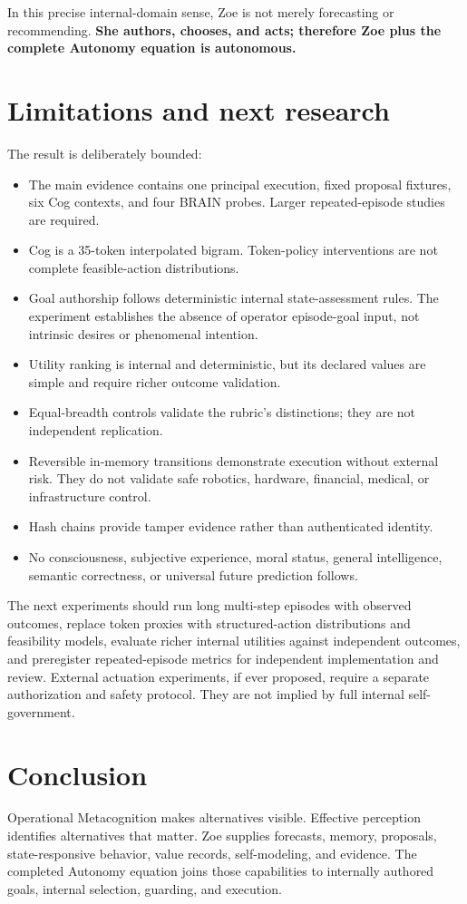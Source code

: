 \documentclass[11pt,a4paper]{article}
\begin{document}
In this precise internal-domain sense, Zoe is not merely forecasting or recommending. \textbf{She authors, chooses, and acts; therefore Zoe plus the complete Autonomy equation is autonomous.}

\section{Limitations and next research}
The result is deliberately bounded:
\begin{itemize}
  \item The main evidence contains one principal execution, fixed proposal fixtures, six Cog contexts, and four BRAIN probes. Larger repeated-episode studies are required.
  \item Cog is a 35-token interpolated bigram. Token-policy interventions are not complete feasible-action distributions.
  \item Goal authorship follows deterministic internal state-assessment rules. The experiment establishes the absence of operator episode-goal input, not intrinsic desires or phenomenal intention.
  \item Utility ranking is internal and deterministic, but its declared values are simple and require richer outcome validation.
  \item Equal-breadth controls validate the rubric's distinctions; they are not independent replication.
  \item Reversible in-memory transitions demonstrate execution without external risk. They do not validate safe robotics, hardware, financial, medical, or infrastructure control.
  \item Hash chains provide tamper evidence rather than authenticated identity.
  \item No consciousness, subjective experience, moral status, general intelligence, semantic correctness, or universal future prediction follows.
\end{itemize}

The next experiments should run long multi-step episodes with observed outcomes, replace token proxies with structured-action distributions and feasibility models, evaluate richer internal utilities against independent outcomes, and preregister repeated-episode metrics for independent implementation and review. External actuation experiments, if ever proposed, require a separate authorization and safety protocol. They are not implied by full internal self-government.

\section{Conclusion}
Operational Metacognition makes alternatives visible. Effective perception identifies alternatives that matter. Zoe supplies forecasts, memory, proposals, state-responsive behavior, value records, self-modeling, and evidence. The completed Autonomy equation joins those capabilities to internally authored goals, internal selection, guarding, and execution.
\end{document}
